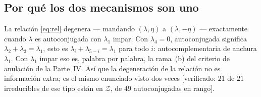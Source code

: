 \documentclass[11pt,a4paper]{article}
\begin{document}
\subsection*{Por qué los dos mecanismos son uno}

La relación \eqref{eq:rel} degenera --- mandando $(\lambda,\eta)$ a $(\lambda,-\eta)$ --- exactamente
cuando $\lambda$ es autoconjugada con $\lambda_1$ impar. Con $\lambda_4=0$, autoconjugada significa
$\lambda_2+\lambda_3=\lambda_1$, esto es $\lambda_i+\lambda_{5-i}=\lambda_1$ para todo $i$:
autocomplementaria de anchura $\lambda_1$. Con $\lambda_1$ impar eso es, palabra por palabra, la
rama~(b) del criterio de anulación de la Parte~IV. Así que la degeneración de la relación no es
información extra; es el mismo enunciado visto dos veces [verificado: $21$ de $21$ irreducibles de
ese tipo están en $\mathcal Z$, de $49$ autoconjugadas en rango].
\end{document}
